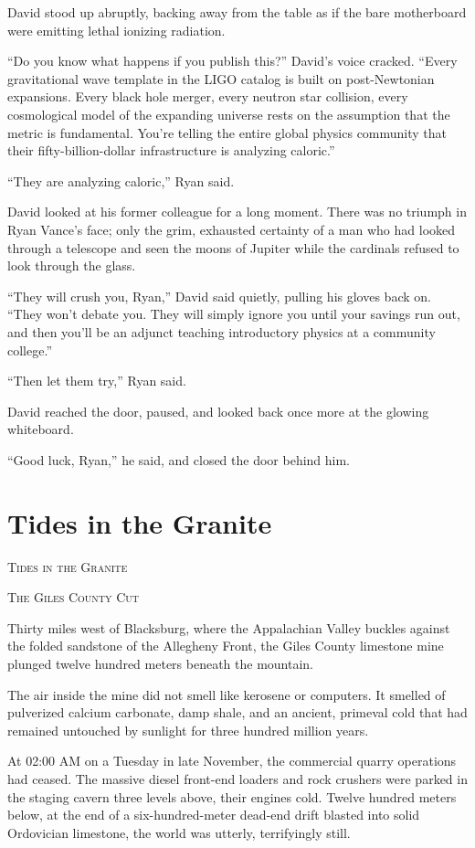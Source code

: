 \documentclass[12pt,twoside,openright]{book}
\newcommand{\sceneheader}[1]{%
  \par\vspace{1.8em}%
  {\noindent\centering\scshape\large #1\par}%
  \vspace{1.0em}%
  \noindent%
}
\begin{document}
David stood up abruptly, backing away from the table as if the bare
motherboard were emitting lethal ionizing radiation.

``Do you know what happens if you publish this?'' David's voice cracked.
``Every gravitational wave template in the LIGO catalog is built on
post-Newtonian expansions. Every black hole merger, every neutron star
collision, every cosmological model of the expanding universe rests on
the assumption that the metric is fundamental. You're telling the entire
global physics community that their fifty-billion-dollar infrastructure
is analyzing caloric.''

``They are analyzing caloric,'' Ryan said.

David looked at his former colleague for a long moment. There was no
triumph in Ryan Vance's face; only the grim, exhausted certainty of a
man who had looked through a telescope and seen the moons of Jupiter
while the cardinals refused to look through the glass.

``They will crush you, Ryan,'' David said quietly, pulling his gloves
back on. ``They won't debate you. They will simply ignore you until your
savings run out, and then you'll be an adjunct teaching introductory
physics at a community college.''

``Then let them try,'' Ryan said.

David reached the door, paused, and looked back once more at the glowing
whiteboard.

``Good luck, Ryan,'' he said, and closed the door behind him.

\chapter{Tides in the Granite}
\sceneheader{Tides in the Granite}

\sceneheader{The Giles County Cut}

Thirty miles west of Blacksburg, where the Appalachian Valley buckles
against the folded sandstone of the Allegheny Front, the Giles County
limestone mine plunged twelve hundred meters beneath the mountain.

The air inside the mine did not smell like kerosene or computers. It
smelled of pulverized calcium carbonate, damp shale, and an ancient,
primeval cold that had remained untouched by sunlight for three hundred
million years.

At 02:00 AM on a Tuesday in late November, the commercial quarry
operations had ceased. The massive diesel front-end loaders and rock
crushers were parked in the staging cavern three levels above, their
engines cold. Twelve hundred meters below, at the end of a
six-hundred-meter dead-end drift blasted into solid Ordovician
limestone, the world was utterly, terrifyingly still.
\end{document}
